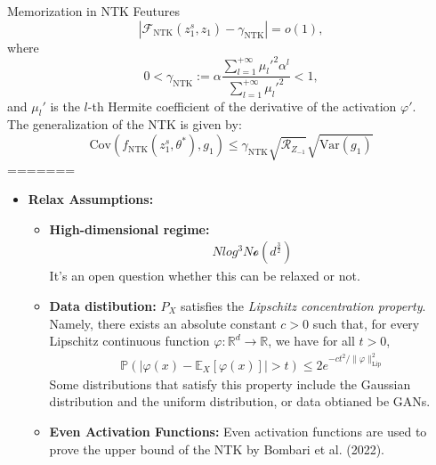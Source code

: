 \documentclass[serif, aspectratio=169]{beamer}
\begin{document}
\begin{frame}{Memorization in NTK Feutures}
	\[
	\left| \mathcal{F}_{\text{NTK}}(z_1^s, z_1) - \gamma_{\text{NTK}} \right| = o(1),
	\]
	where 
	\[
	0 < \gamma_{\text{NTK}} := \alpha \frac{\sum_{l=1}^{+\infty} \mu_l'^2 \alpha^l}{\sum_{l=1}^{+\infty} \mu_l'^2} < 1, \tag{26}
	\]
	and $\mu_l'$ is the $l$-th Hermite coefficient of the derivative of the activation $\varphi'$.\\
	The generalization of the NTK is given by:
	\[
	\text{Cov}\left(f_{\text{NTK}}(z_1^s, \theta^*), g_1\right) \leq \gamma_{\text{NTK}} \sqrt{\mathcal{R}_{Z_{-1}}} \sqrt{\text{Var}(g_1)}
	\]
=======
    \begin{itemize}
        \item \textbf{Relax Assumptions:}
            \begin{itemize}
                \item \textbf{High-dimensional regime: }
                \begin{align*}
                    N log^{3} N \mathcal{o}(d^{\frac{3}{2}})
                \end{align*}
                It's an open question whether this can be relaxed or not.
                \item \textbf{Data distibution: }
                $P_X$ satisfies the \textit{Lipschitz concentration property}. Namely, there exists an absolute constant $c > 0$ such that, for every Lipschitz continuous function $\varphi : \mathbb{R}^d \to \mathbb{R}$, we have for all $t > 0$,
                \begin{align*}
                    \mathbb{P}\left( \left| \varphi(x) - \mathbb{E}_X[\varphi(x)] \right| > t \right) \leq 2e^{-ct^2 / \|\varphi\|_{\text{Lip}}^2}
                \end{align*}
                Some distributions that satisfy this property include the Gaussian distribution and the uniform distribution, or data obtianed be GANs.
                \item \textbf{Even Activation Functions: }
                Even activation functions are used to prove the upper bound of the NTK by Bombari et al. (2022).  
            \end{itemize}
    \end{itemize}
\end{frame}
\end{document}
